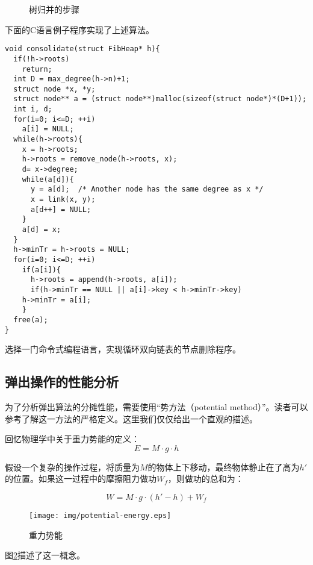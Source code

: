 \documentclass[UTF8]{article}
\begin{document}
\begin{figure}[htbp]
  \centering
  \caption{树归并的步骤} \label{fig:fib-cons-c}
\end{figure}

下面的C语言例子程序实现了上述算法。

\lstset{language = C}
\begin{lstlisting}
void consolidate(struct FibHeap* h){
  if(!h->roots)
    return;
  int D = max_degree(h->n)+1;
  struct node *x, *y;
  struct node** a = (struct node**)malloc(sizeof(struct node*)*(D+1));
  int i, d;
  for(i=0; i<=D; ++i)
    a[i] = NULL;
  while(h->roots){
    x = h->roots;
    h->roots = remove_node(h->roots, x);
    d= x->degree;
    while(a[d]){
      y = a[d];  /* Another node has the same degree as x */
      x = link(x, y);
      a[d++] = NULL;
    }
    a[d] = x;
  }
  h->minTr = h->roots = NULL;
  for(i=0; i<=D; ++i)
    if(a[i]){
      h->roots = append(h->roots, a[i]);
      if(h->minTr == NULL || a[i]->key < h->minTr->key)
	h->minTr = a[i];
    }
  free(a);
}
\end{lstlisting}

\begin{Exercise}
选择一门命令式编程语言，实现循环双向链表的节点删除程序。
\end{Exercise}

\subsection{弹出操作的性能分析}

为了分析弹出算法的分摊性能，需要使用“势方法（potential method）”。读者可以参考\cite{CLRS}了解这一方法的严格定义。这里我们仅仅给出一个直观的描述。

回忆物理学中关于重力势能的定义：
\[
E = M \cdot g \cdot h
\]

假设一个复杂的操作过程，将质量为$M$的物体上下移动，最终物体静止在了高为$h'$的位置。如果这一过程中的摩擦阻力做功$W_f$，则做功的总和为：

\[
W = M \cdot g \cdot (h' - h) + W_f
\]

\begin{figure}[htbp]
  \centering
  \texttt{[image: img/potential-energy.eps]}
  \caption{重力势能}
  \label{fig:potential-energy}
\end{figure}

图\ref{fig:potential-energy}描述了这一概念。
\end{document}
